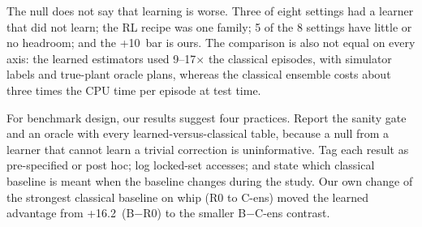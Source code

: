 The null does not say that learning is worse. Three of eight settings had a learner that did not learn; the RL recipe was one family; 5 of the 8 settings have little or no headroom; and the +10\pp\ bar is ours. The comparison is also not equal on every axis: the learned estimators used 9--17$\times$ the classical episodes, with simulator labels and true-plant oracle plans, whereas the classical ensemble costs about three times the CPU time per episode at test time.

For benchmark design, our results suggest four practices. Report the sanity gate and an oracle with every learned-versus-classical table, because a null from a learner that cannot learn a trivial correction is uninformative. Tag each result as pre-specified or post hoc; log locked-set accesses; and state which classical baseline is meant when the baseline changes during the study. Our own change of the strongest classical baseline on whip (R0 to C-ens) moved the learned advantage from +16.2\pp\ (B$-$R0) to the smaller B$-$C-ens contrast.
